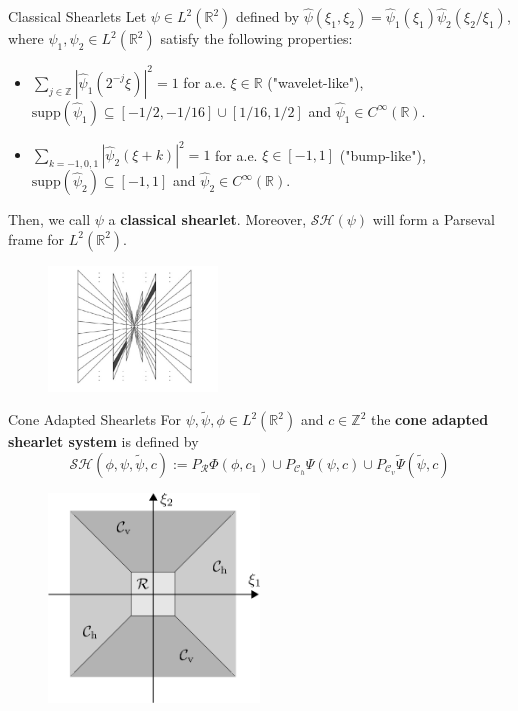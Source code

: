 \begin{frame}
\begin{block}{Classical Shearlets}
Let $\psi\in L^2(\mathbb{R}^2)$ defined by $\hat{\psi}(\xi_1,\xi_2)=\hat{\psi}_1(\xi_1)\hat{\psi}_2(\xi_2/\xi_1)$, where $\psi_1,\psi_2\in L^2(\mathbb{R}^2)$ satisfy the following properties:
\begin{itemize}
\item $\sum_{j\in\mathbb{Z}}|\hat{\psi}_1(2^{-j}\xi)|^2=1$ for a.e. $\xi\in\mathbb{R}$ ("wavelet-like"), $\text{supp}(\hat{\psi}_1)\subseteq [-1/2,-1/16]\cup [1/16,1/2]$ and $\hat{\psi}_1\in C^{\infty}(\mathbb{R})$.
\item $\sum_{k=-1,0,1}|\hat{\psi}_2(\xi+k)|^2=1$ for a.e. $\xi\in [-1,1]$ ("bump-like"), $\text{supp}(\hat{\psi}_2)\subseteq [-1,1]$ and $\hat{\psi}_2\in C^{\infty}(\mathbb{R})$.
\end{itemize}
Then, we call $\psi$ a \textbf{classical shearlet}. Moreover, $\mathcal{SH}(\psi)$ will form a Parseval frame for $L^2(\mathbb{R}^2)$.
\end{block}
\pause
\begin{figure}[!tbp]
  \centering
   \includegraphics[width=0.4\textwidth]{../../Diagrams/tiling_nocone.jpg}
\end{figure}
\end{frame}

\begin{frame}
\begin{block}{Cone Adapted Shearlets}
For $\psi,\tilde{\psi},\phi\in L^2(\mathbb{R}^2)$ and $c\in \mathbb{Z}^2$ the \textbf{cone adapted shearlet system} is defined by 
$$
\mathcal{SH}(\phi,\psi,\tilde{\psi},c):=P_{\mathcal{R}}\Phi(\phi,c_1)\cup P_{\mathcal{C}_h}\Psi(\psi,c)\cup P_{\mathcal{C}_v}\tilde{\Psi}(\tilde{\psi},c)
$$
\end{block}
\begin{figure}[h!]
\includegraphics[width=0.5\textwidth]{../../Diagrams/cones.jpg}
\end{figure}
\end{frame}

